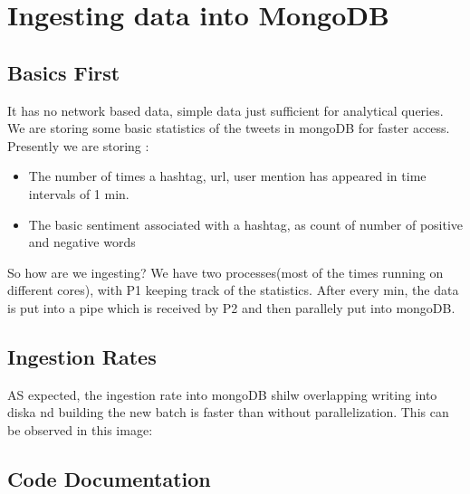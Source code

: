 \documentclass[letterpaper,10pt,english]{sphinxmanual}
\begin{document}
\chapter{Ingesting data into MongoDB}
\label{\detokenize{mongoDB_data_ingestion::doc}}\label{\detokenize{mongoDB_data_ingestion:ingesting-data-into-mongodb}}

\section{Basics First}
\label{\detokenize{mongoDB_data_ingestion:basics-first}}
It has no network based data, simple data just sufficient for analytical queries.
We are storing some basic statistics of the tweets in mongoDB for faster access.  Presently we are storing :
\begin{itemize}
\item {} 
The number of times a hashtag, url, user mention has appeared in time intervals of 1 min.

\item {} 
The  basic  sentiment  associated  with  a  hashtag,  as  count  of  number  of  positive  and negative words

\end{itemize}

So how are we ingesting? We have two processes(most of the times running on different cores), with P1 keeping track of the statistics.  After every min, the data is put into a pipe which is received by P2 and then parallely put into mongoDB.


\section{Ingestion Rates}
\label{\detokenize{mongoDB_data_ingestion:ingestion-rates}}
AS expected, the ingestion rate into mongoDB shilw overlapping writing into diska nd building the new batch is faster than without parallelization. This can be observed in this image:

\noindent{}


\section{Code Documentation}
\label{\detokenize{mongoDB_data_ingestion:code-documentation}}\label{\detokenize{mongoDB_data_ingestion:module-ingest_raw}}
\end{document}
